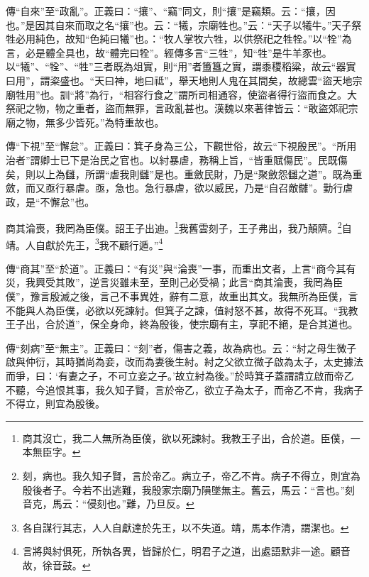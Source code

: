 {\noindent\zhuan{}\fzbyks 傳“自來”至“政亂”。正義曰：“攘”、“竊”同文，則“攘”是竊類。云：“攘，因也。”是因其自來而取之名“攘”也。云：“犧，宗廟牲也。”云：“天子以犧牛。”天子祭牲必用純色，故知“色純曰犧”也。：“牧人掌牧六牲，以供祭祀之牲牷。”以“牷”為言，必是體全具也，故“體完曰牷”。經傳多言“三牲”，知“牲”是牛羊豕也。以“犧”、“牷”、“牲”三者既為俎實，則“用”者簠簋之實，謂黍稷稻粱，故云“器實曰用”，謂粢盛也。“天曰神，地曰祗”，舉天地則人鬼在其間矣，故總雲“盜天地宗廟牲用”也。訓“將”為行，“相容行食之”謂所司相通容，使盜者得行盜而食之。大祭祀之物，物之重者，盜而無罪，言政亂甚也。漢魏以來著律皆云：“敢盜郊祀宗廟之物，無多少皆死。”為特重故也。 \par}

{\noindent\zhuan{}\fzbyks 傳“下視”至“懈怠”。正義曰：箕子身為三公，下觀世俗，故云“下視殷民”。“所用治者”謂卿士已下是治民之官也。以紂暴虐，務稱上旨，“皆重賦傷民”。民既傷矣，則以上為讎，所謂“虐我則讎”是也。重斂民財，乃是“聚斂怨讎之道”。既為重斂，而又亟行暴虐。亟，急也。急行暴虐，欲以威民，乃是“自召敵讎”。勤行虐政，是“不懈怠”也。 \par}

商其淪喪，我罔為臣僕。詔王子出迪。\footnote{商其沒亡，我二人無所為臣僕，欲以死諫紂。我教王子出，合於道。臣僕，一本無臣字。}我舊雲刻子，王子弗出，我乃顛隮。\footnote{刻，病也。我久知子賢，言於帝乙。病立子，帝乙不肯。病子不得立，則宜為殷後者子。今若不出逃難，我殷家宗廟乃隕墜無主。舊云，馬云：“言也。”刻音克，馬云：“侵刻也。”難，乃旦反。}自靖。人自獻於先王，\footnote{各自謀行其志，人人自獻達於先王，以不失道。靖，馬本作清，謂潔也。}我不顧行遁。”\footnote{言將與紂俱死，所執各異，皆歸於仁，明君子之道，出處語默非一途。顧音故，徐音鼓。}

{\noindent\zhuan{}\fzbyks 傳“商其”至“於道”。正義曰：“有災”與“淪喪”一事，而重出文者，上言“商今其有災，我興受其敗”，逆言災雖未至，至則己必受禍；此言“商其淪喪，我罔為臣僕”，豫言殷滅之後，言己不事異姓，辭有二意，故重出其文。我無所為臣僕，言不能與人為臣僕，必欲以死諫紂。但箕子之諫，值紂怒不甚，故得不死耳。“我教王子出，合於道”，保全身命，終為殷後，使宗廟有主，享祀不絕，是合其道也。 \par}

{\noindent\zhuan{}\fzbyks 傳“刻病”至“無主”。正義曰：“刻”者，傷害之義，故為病也。云：“紂之母生微子啟與仲衍，其時猶尚為妾，改而為妻後生紂。紂之父欲立微子啟為太子，太史據法而爭，曰：‘有妻之子，不可立妾之子。’故立紂為後。”於時箕子蓋謂請立啟而帝乙不聽，今追恨其事，我久知子賢，言於帝乙，欲立子為太子，而帝乙不肯，我病子不得立，則宜為殷後。 \par}

